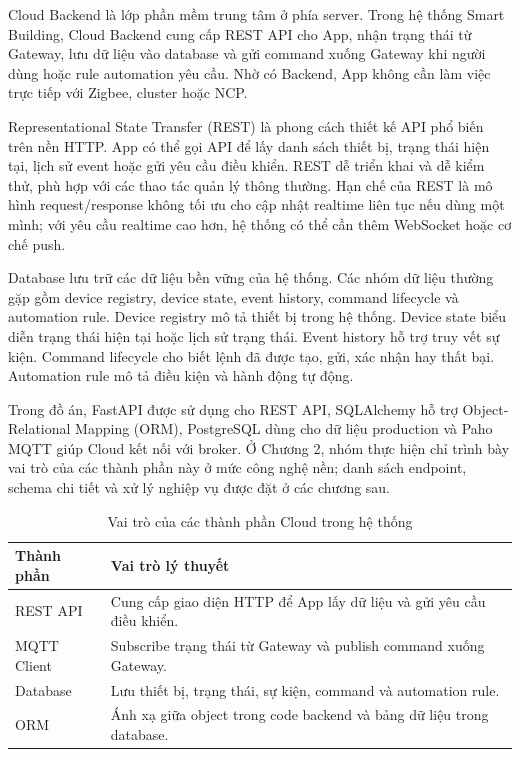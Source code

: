 Cloud Backend là lớp phần mềm trung tâm ở phía server. Trong hệ thống Smart Building, Cloud Backend cung cấp REST API cho App, nhận trạng thái từ Gateway, lưu dữ liệu vào database và gửi command xuống Gateway khi người dùng hoặc rule automation yêu cầu. Nhờ có Backend, App không cần làm việc trực tiếp với Zigbee, cluster hoặc NCP.

Representational State Transfer (REST) là phong cách thiết kế API phổ biến trên nền HTTP. App có thể gọi API để lấy danh sách thiết bị, trạng thái hiện tại, lịch sử event hoặc gửi yêu cầu điều khiển. REST dễ triển khai và dễ kiểm thử, phù hợp với các thao tác quản lý thông thường. Hạn chế của REST là mô hình request/response không tối ưu cho cập nhật realtime liên tục nếu dùng một mình; với yêu cầu realtime cao hơn, hệ thống có thể cần thêm WebSocket hoặc cơ chế push.

Database lưu trữ các dữ liệu bền vững của hệ thống. Các nhóm dữ liệu thường gặp gồm device registry, device state, event history, command lifecycle và automation rule. Device registry mô tả thiết bị trong hệ thống. Device state biểu diễn trạng thái hiện tại hoặc lịch sử trạng thái. Event history hỗ trợ truy vết sự kiện. Command lifecycle cho biết lệnh đã được tạo, gửi, xác nhận hay thất bại. Automation rule mô tả điều kiện và hành động tự động.

Trong đồ án, FastAPI được sử dụng cho REST API, SQLAlchemy hỗ trợ Object-Relational Mapping (ORM), PostgreSQL dùng cho dữ liệu production và Paho MQTT giúp Cloud kết nối với broker. Ở Chương 2, nhóm thực hiện chỉ trình bày vai trò của các thành phần này ở mức công nghệ nền; danh sách endpoint, schema chi tiết và xử lý nghiệp vụ được đặt ở các chương sau.

\begin{table}[H]
\centering
\caption{Vai trò của các thành phần Cloud trong hệ thống}
\label{tab:ch2-cloud-components}
\begin{tabular}{|>{\raggedright\arraybackslash}p{3.5cm}|>{\raggedright\arraybackslash}p{9.5cm}|}
\hline
\textbf{Thành phần} & \textbf{Vai trò lý thuyết} \\ \hline
REST API & Cung cấp giao diện HTTP để App lấy dữ liệu và gửi yêu cầu điều khiển. \\ \hline
MQTT Client & Subscribe trạng thái từ Gateway và publish command xuống Gateway. \\ \hline
Database & Lưu thiết bị, trạng thái, sự kiện, command và automation rule. \\ \hline
ORM & Ánh xạ giữa object trong code backend và bảng dữ liệu trong database. \\ \hline
\end{tabular}
\end{table}

